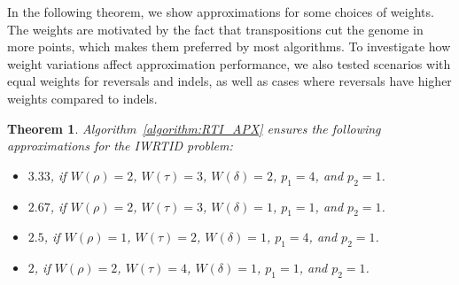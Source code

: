 \documentclass[12pt]{article}
\newtheorem{theorem}{Theorem}
\begin{document}
In the following theorem, we show approximations for some choices of weights. The weights are motivated by the fact that transpositions cut the genome in more points, which makes them preferred by most algorithms.
To investigate how weight variations affect approximation performance, we also tested scenarios with equal weights for reversals and indels, as well as cases where reversals have higher weights compared to indels.

\vspace{8pt}
\begin{theorem}
Algorithm~\ref{algorithm:RTI_APX} ensures the following approximations for the IWRTID problem:
\begin{itemize}
    \item $3.33$, if $W(\rho) = 2$, $W(\tau) = 3$, $W(\delta) = 2$, $p_1 = 4$, and $p_2 = 1$.
    \item $2.67$, if $W(\rho) = 2$, $W(\tau) = 3$, $W(\delta) = 1$, $p_1 = 1$, and $p_2 = 1$.
    \item $2.5$, if $W(\rho) = 1$, $W(\tau) = 2$, $W(\delta) = 1$, $p_1 = 4$, and $p_2 = 1$.
    \item $2$, if $W(\rho) = 2$, $W(\tau) = 4$, $W(\delta) = 1$, $p_1 = 1$, and $p_2 = 1$.
\end{itemize}
\end{theorem}
\end{document}
